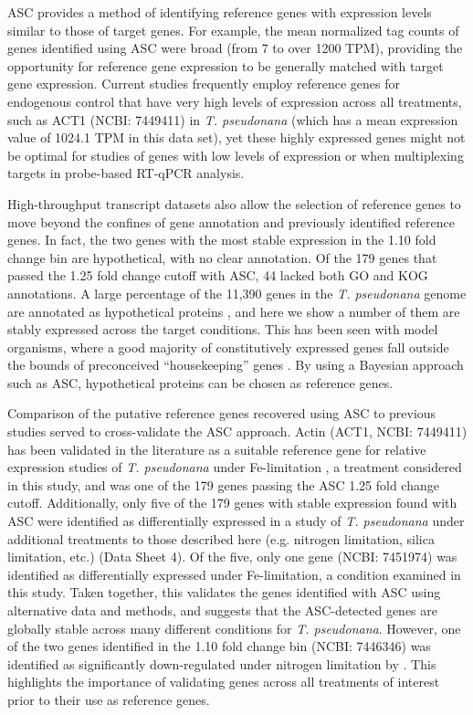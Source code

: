 	ASC provides a method of identifying reference genes with expression levels similar to those of target genes. For example, the mean normalized tag counts of genes identified using ASC were broad (from 7 to over 1200 TPM), providing the opportunity for reference gene expression to be generally matched with target gene expression. Current studies frequently employ reference genes for endogenous control that have very high levels of expression across all treatments, such as ACT1 (NCBI: 7449411) in \textit{T. pseudonana} (which has a mean expression value of 1024.1 TPM in this data set), yet these highly expressed genes might not be optimal for studies of genes with low levels of expression or when multiplexing targets in probe-based RT-qPCR analysis. \par
	High-throughput transcript datasets also allow the selection of reference genes to move beyond the confines of gene annotation and previously identified reference genes. In fact, the two genes with the most stable expression in the 1.10 fold change bin are hypothetical, with no clear annotation. Of the 179 genes that passed the 1.25 fold change cutoff with ASC, 44 lacked both GO and KOG annotations. A large percentage of the 11,390 genes in the \textit{T. pseudonana} genome are annotated as hypothetical proteins \citep{Armbrust2004, Mock2008}, and here we show a number of them are stably expressed across the target conditions. This has been seen with model organisms, where a good majority of constitutively expressed genes fall outside the bounds of preconceived ``housekeeping'' genes \citep{Czechowski2005, DeJonge2007a}. By using a Bayesian approach such as ASC, hypothetical proteins can be chosen as reference genes. \par
	Comparison of the putative reference genes recovered using ASC to previous studies served to cross-validate the ASC approach. Actin (ACT1, NCBI: 7449411) has been validated in the literature as a suitable reference gene for relative expression studies of \textit{T. pseudonana} under Fe-limitation \citep{Whitney2011a}, a treatment considered in this study, and was one of the 179 genes passing the ASC 1.25 fold change cutoff. Additionally, only five of the 179 genes with stable expression found with ASC were identified as differentially expressed in a study of \textit{T. pseudonana} under additional treatments to those described here (e.g. nitrogen limitation, silica limitation, etc.) \citep{Mock2008} (Data Sheet 4). Of the five, only one gene (NCBI: 7451974) was identified as differentially expressed under Fe-limitation, a condition examined in this study. Taken together, this validates the genes identified with ASC using alternative data and methods, and suggests that the ASC-detected genes are globally stable across many different conditions for \textit{T. pseudonana}. However, one of the two genes identified in the 1.10 fold change bin (NCBI: 7446346) was identified as significantly down-regulated under nitrogen limitation by \citet{Mock2008}. This highlights the importance of validating genes across all treatments of interest prior to their use as reference genes. \par
